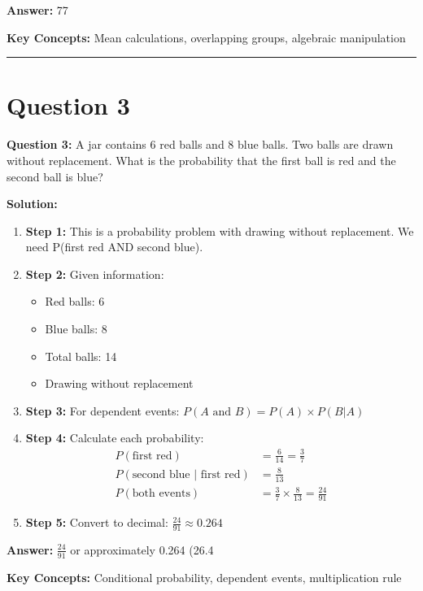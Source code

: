 \documentclass[12pt]{article}
\begin{document}
\textbf{Answer:} 77

\textbf{Key Concepts:} Mean calculations, overlapping groups, algebraic manipulation

\hrule
\vspace{1em}

\newpage

\section{Question 3}

\textbf{Question 3:} A jar contains 6 red balls and 8 blue balls. Two balls are drawn without replacement. What is the probability that the first ball is red and the second ball is blue?

\textbf{Solution:}
\begin{enumerate}
\item \textbf{Step 1:} This is a probability problem with drawing without replacement. We need P(first red AND second blue).

\item \textbf{Step 2:} Given information:
\begin{itemize}
\item Red balls: 6
\item Blue balls: 8
\item Total balls: 14
\item Drawing without replacement
\end{itemize}

\item \textbf{Step 3:} For dependent events: $P(A \text{ and } B) = P(A) \times P(B|A)$

\item \textbf{Step 4:} Calculate each probability:
\begin{align}
P(\text{first red}) &= \frac{6}{14} = \frac{3}{7} \\
P(\text{second blue | first red}) &= \frac{8}{13} \\
P(\text{both events}) &= \frac{3}{7} \times \frac{8}{13} = \frac{24}{91}
\end{align}

\item \textbf{Step 5:} Convert to decimal: $\frac{24}{91} \approx 0.264$
\end{enumerate}

\textbf{Answer:} $\frac{24}{91}$ or approximately 0.264 (26.4%

\textbf{Key Concepts:} Conditional probability, dependent events, multiplication rule
\end{document}
